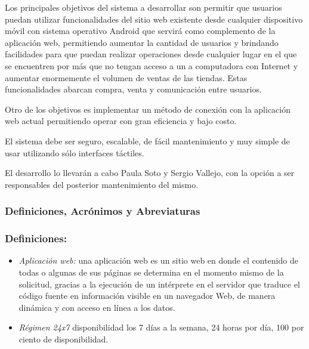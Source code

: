 Los principales objetivos del sistema a desarrollar son permitir que usuarios puedan utilizar funcionalidades del sitio web existente desde cualquier dispositivo móvil con sistema operativo Android que servirá como complemento de la aplicación web, permitiendo aumentar la cantidad de usuarios y brindando facilidades para que puedan realizar operaciones desde cualquier lugar en el que se encuentren por más que no tengan acceso a un a computadora con Internet y aumentar enormemente el volumen de ventas de las tiendas. Estas funcionalidades abarcan compra, venta y comunicación entre usuarios.

Otro de los objetivos es implementar un método de conexión con la aplicación web actual permitiendo operar con gran eficiencia y bajo costo.

El sistema debe ser seguro, escalable, de fácil mantenimiento y muy simple de usar utilizando sólo interfaces táctiles.

El desarrollo lo llevarán a cabo Paula Soto y Sergio Vallejo, con la opción a ser responsables del posterior mantenimiento del mismo.

 
    \subsubsection{Definiciones, Acrónimos y Abreviaturas}
    \subsubsection{Definiciones:}
  
        \begin{itemize}
 
        \item \emph{Aplicación web:} una aplicación web es un sitio web en donde el contenido de todas o algunas de sus páginas se determina en el momento mismo de la solicitud, gracias a la ejecución de un intérprete en el servidor que traduce el código fuente en información visible en un navegador Web, de manera dinámica y con acceso en línea a los datos.
 
        \item \emph{Régimen 24x7} disponibilidad los 7 días a la semana, 24 horas por día, 100 por ciento de disponibilidad.
        \end{itemize}

